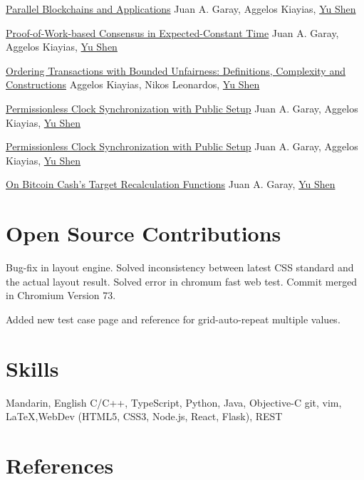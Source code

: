 \documentclass[11pt,a4paper,sans]{moderncv}
\begin{document}
{\href{https://cibe24.bici.events/home}{Parallel Blockchains and Applications}}
{}
{}
{}
{\normalsize Juan A. Garay, Aggelos Kiayias, \underline{Yu Shen}}

{\href{https://youtu.be/uvAEvkGZymg?t=2400}{Proof-of-Work-based Consensus in Expected-Constant Time}}
{}
{}
{}
{\normalsize Juan A. Garay, Aggelos Kiayias, \underline{Yu Shen}}

{\href{https://youtu.be/uvAEvkGZymg}{Ordering Transactions with Bounded Unfairness: Definitions, Complexity and Constructions}}
{}
{}
{}
{\normalsize Aggelos Kiayias, Nikos Leonardos, \underline{Yu Shen}}

{\href{https://texascryptoday.github.io/events/2-UTAustin.html}{Permissionless Clock Synchronization with Public Setup}}
{}
{}
{}
{\normalsize Juan A. Garay, Aggelos Kiayias, \underline{Yu Shen}}

{\href{https://youtu.be/JUYzY-1mcYM}{Permissionless Clock Synchronization with Public Setup}}
{}
{}
{}
{\normalsize Juan A. Garay, Aggelos Kiayias, \underline{Yu Shen}}

{{\href{https://youtu.be/5K6HNCtLPtk}{On Bitcoin Cash's Target Recalculation Functions}}}
{}
{}
{}
{\normalsize Juan A. Garay, \underline{Yu Shen}}

\section{Open Source Contributions}

{Bug-fix in layout engine. Solved inconsistency between latest CSS standard and the actual layout result. Solved error in chromum fast web test. Commit merged in Chromium Version 73.}

{Added new test case page and reference for grid-auto-repeat multiple values.}


\section{Skills}

{Mandarin, English}
{C/C++, TypeScript, Python, Java, Objective-C}
{git, vim, \LaTeX,WebDev (HTML5, CSS3, Node.js, React, Flask), REST}


\section{References}

\end{document}
